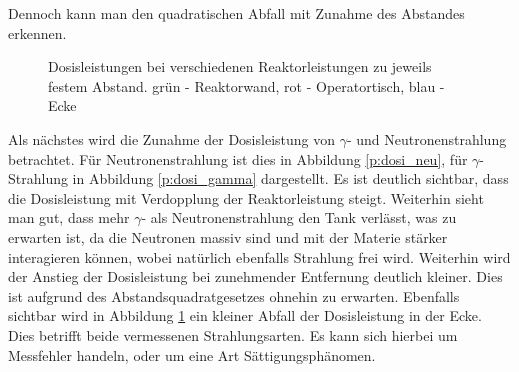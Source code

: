     Dennoch kann man den quadratischen Abfall mit Zunahme des Abstandes erkennen.
        \begin{figure}
            \caption{Dosisleistungen bei verschiedenen Reaktorleistungen zu jeweils festem Abstand. grün - Reaktorwand, rot - Operatortisch, blau - Ecke}
            \label{df:dosi_g_n}                    
        \end{figure}
    Als nächstes wird die Zunahme der Dosisleistung von $\gamma$- und Neutronenstrahlung betrachtet. Für Neutronenstrahlung ist dies in Abbildung \ref{p:dosi_neu}, für $\gamma$-Strahlung in Abbildung \ref{p:dosi_gamma} dargestellt.
    Es ist deutlich sichtbar, dass die Dosisleistung mit Verdopplung der Reaktorleistung steigt. Weiterhin sieht man gut, dass mehr $\gamma$- als Neutronenstrahlung den Tank verlässt, was zu erwarten ist, da die Neutronen massiv sind und mit der Materie stärker interagieren können, wobei natürlich ebenfalls Strahlung frei wird.
    Weiterhin wird der Anstieg der Dosisleistung bei zunehmender Entfernung deutlich kleiner. Dies ist aufgrund des Abstandsquadratgesetzes ohnehin zu erwarten.
    Ebenfalls sichtbar wird in Abbildung \ref{df:dosi_g_n} ein kleiner Abfall der Dosisleistung in der Ecke. Dies betrifft beide vermessenen Strahlungsarten. Es kann sich hierbei um Messfehler handeln, oder um eine Art Sättigungsphänomen.
    
